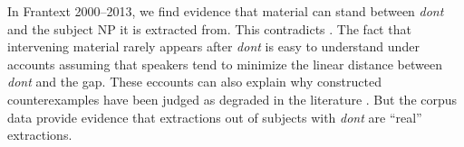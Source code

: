 In Frantext 2000--2013, we find evidence that material can stand between \emph{dont} and the subject NP it is extracted from. This contradicts \citet{Heck.2009}. The fact that intervening material rarely appears after \emph{dont} is easy to understand under accounts assuming that speakers tend to minimize the linear distance between \emph{dont} and the gap. These eccounts can also explain why constructed counterexamples have been judged as degraded in the literature \citep[e.g.,][]{Tellier.1990}. But the corpus data provide evidence that extractions out of subjects with \emph{dont} are ``real'' extractions.  
